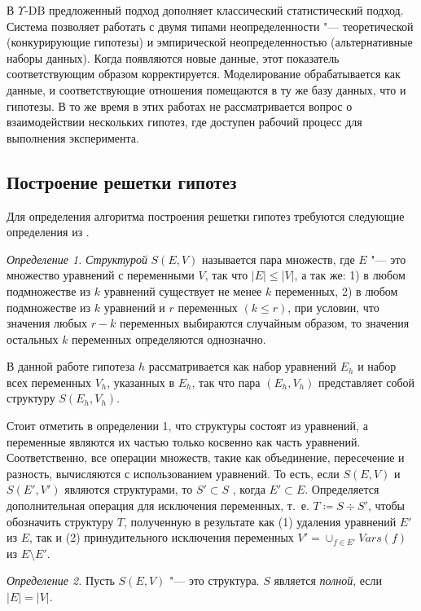 В $\Upsilon$-DB предложенный подход дополняет классический статистический подход. Система позволяет работать с двумя 
типами неопределенности "--- теоретической (конкурирующие гипотезы) и эмпирической неопределенностью (альтернативные 
наборы данных). Когда появляются новые данные, этот показатель соответствующим образом корректируется. Моделирование 
обрабатывается как данные, и соответствующие отношения помещаются в ту же базу данных, что и гипотезы. В то же время 
в этих работах не рассматривается вопрос о взаимодействии нескольких гипотез, где доступен рабочий процесс для 
выполнения эксперимента.

\subsection{Построение решетки гипотез} \label{sect2_3_1}
Для определения алгоритма построения решетки гипотез требуются следующие определения из 
\cite{Goncalves2016, kovalev2019constructing}.

\textit{Определение 1.} \textit{Структурой} $S\left(E, V\right)$ называется пара множеств, где $E$ "--- 
это множество уравнений с переменными $V$, так что $|E| \leq |V| $, а так же: 1) в любом подмножестве из $k$ 
уравнений существует не менее $k$ переменных, 2) в любом подмножестве из $k$ уравнений и $r$ 
переменных $\left(k\leq r\right)$, при условии, что значения любых $r-k$ переменных выбираются случайным 
образом, то значения остальных $k$ переменных определяются однозначно.

В данной работе гипотеза $h$ рассматривается как набор уравнений $E_h$ и набор всех переменных $V_h$, указанных 
в $E_h$, так что пара $\left(E_h, V_h\right)$ представляет собой структуру $S\left(E_h, V_h\right)$.

Стоит отметить в определении 1, что структуры состоят из уравнений, а переменные являются их частью только косвенно 
как часть уравнений. Соответственно, все операции множеств, такие как объединение, пересечение и разность, вычисляются 
с использованием уравнений. То есть, если $S(E, V)$ и $S(E',V')$ являются структурами, то $S' \subset S$ , 
когда $E' \subset E$. Определяется дополнительная операция для исключения переменных, т.~е. $T \coloneqq S \div S'$, 
чтобы обозначить структуру $T$, полученную в результате как (1) удаления уравнений $E'$ из $E$, так и 
(2) принудительного исключения переменных $V' = \cup_{f \in E'} Vars(f)$ из $E\setminus	E'$.

\textit{Определение 2.} Пусть $S\left( E, V\right)$ "--- это структура. $S$ является \textit{полной}, если $|E| = |V|$.

